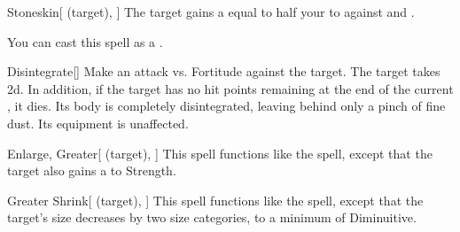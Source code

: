 \lowercase{\hypertarget{spell:Stoneskin}{}}\label{spell:Stoneskin}
\begin{attuneability}[\nth{4}]{\hypertarget{spell:Stoneskin}{Stoneskin}}[ (target), ]
The target gains a  equal to half your  to  against  and .

You can cast this spell as a .
\end{attuneability}
\vspace{0.25em}



\lowercase{\hypertarget{spell:Disintegrate}{}}\label{spell:Disintegrate}
\begin{freeability}[\nth{5}]{\hypertarget{spell:Disintegrate}{Disintegrate}}[]
Make an attack vs. Fortitude against the target.
\hit The target takes  \plus2d.
In addition, if the target has no hit points remaining at the end of the current , it dies.
Its body is completely disintegrated, leaving behind only a pinch of fine dust.
Its equipment is unaffected.
\end{freeability}
\vspace{0.25em}



\lowercase{\hypertarget{spell:Enlarge, Greater}{}}\label{spell:Enlarge, Greater}
\begin{attuneability}[\nth{5}]{\hypertarget{spell:Enlarge, Greater}{Enlarge, Greater}}[ (target), ]
This spell functions like the  spell, except that the target also gains a   to Strength.
\end{attuneability}
\vspace{0.25em}



\lowercase{\hypertarget{spell:Greater Shrink}{}}\label{spell:Greater Shrink}
\begin{attuneability}[\nth{5}]{\hypertarget{spell:Greater Shrink}{Greater Shrink}}[ (target), ]
This spell functions like the  spell, except that the target's size decreases by two size categories, to a minimum of Diminuitive.
\end{attuneability}
\vspace{0.25em}



